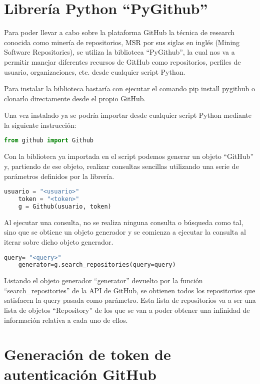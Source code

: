\section{Librería Python ``PyGithub''}

Para poder llevar a cabo sobre la plataforma GitHub la técnica de research conocida como minería de repositorios, MSR por sus siglas en inglés (Mining Software Repositories), se utiliza la biblioteca ``PyGithub'', la cual nos va a permitir manejar diferentes recursos de GitHub como repositorios, perfiles de usuario, organizaciones, etc. desde cualquier script Python.

Para instalar la biblioteca bastaría con ejecutar el comando pip install pygithub o clonarlo directamente desde el propio GitHub.

Una vez instalado ya se podría importar desde cualquier script Python mediante la siguiente instrucción:

\begin{lstlisting}[language=Python]
    from github import Github
\end{lstlisting}

Con la biblioteca ya importada en el script podemos generar un objeto ``GitHub'' y, partiendo de ese objeto, realizar consultas sencillas utilizando una serie de parámetros definidos por la librería.

\begin{lstlisting}[language=Python]
    usuario = "<usuario>" 
    token = "<token>"
    g = Github(usuario, token)
\end{lstlisting}

Al ejecutar una consulta, no se realiza ninguna consulta o búsqueda como tal, sino que se obtiene un objeto generador y se comienza a ejecutar la consulta al iterar sobre dicho objeto generador.

\begin{lstlisting}[language=Python]
    query= "<query>" 
    generator=g.search_repositories(query=query)
\end{lstlisting}



Listando el objeto generador “generator” devuelto por la función ``search\_repositories'' de la API de GitHub, se obtienen todos los repositorios que satisfacen la query pasada como parámetro. Esta lista de repositorios va a ser una lista de objetos “Repository” de los que se van a poder obtener una infinidad de información relativa a cada uno de ellos.

\section{Generación de token de autenticación GitHub}

